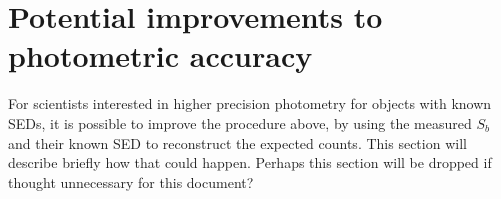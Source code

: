 \documentclass[12pt,preprint]{aastex}
\begin{document}
\section{Potential improvements to photometric accuracy}

For scientists interested in higher precision photometry for objects
with known SEDs, it is possible to improve the procedure above, by
using the measured $S_b$ and their known SED to reconstruct the
expected counts. 
This section will describe briefly how that could happen. 
Perhaps this section will be dropped if thought unnecessary for this document?





\end{document}
